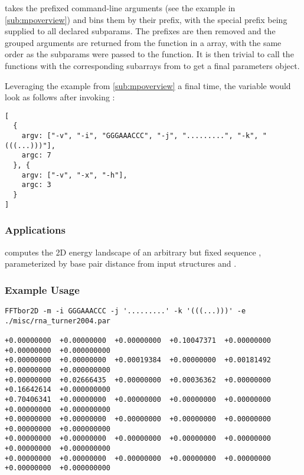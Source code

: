 \documentclass[11pt]{article}
\begin{document}
 takes the prefixed command-line arguments (see the example in \ref{sub:mpoverview}) and bins them by their prefix, with the special  prefix being supplied to all declared subparams. The prefixes are then removed and the grouped arguments are returned from the function in a  array, with the same order as the subparams were passed to the function. It is then trivial to call the  functions with the corresponding subarrays from  to get a final parameters object.

Leveraging the example from \ref{sub:mpoverview} a final time, the variable  would look as follows after invoking :
\begin{verbatim}
[
  {
    argv: ["-v", "-i", "GGGAAACCC", "-j", ".........", "-k", "(((...)))"],
    argc: 7
  }, {
    argv: ["-v", "-x", "-h"],
    argc: 3
  }
]
\end{verbatim}



\subsubsection{Applications} \label{subsub:fftborapp}

\fft computes the 2D energy landscape of an arbitrary but fixed sequence \s, parameterized by base pair distance from input structures \A and \B.

\subsubsection{Example Usage} \label{subsub:fftborex}

\begin{verbatim}
FFTbor2D -m -i GGGAAACCC -j '.........' -k '(((...)))' -e ./misc/rna_turner2004.par

+0.00000000  +0.00000000  +0.00000000  +0.10047371  +0.00000000  +0.00000000  +0.000000000
+0.00000000  +0.00000000  +0.00019384  +0.00000000  +0.00181492  +0.00000000  +0.000000000
+0.00000000  +0.02666435  +0.00000000  +0.00036362  +0.00000000  +0.16642614  +0.000000000
+0.70406341  +0.00000000  +0.00000000  +0.00000000  +0.00000000  +0.00000000  +0.000000000
+0.00000000  +0.00000000  +0.00000000  +0.00000000  +0.00000000  +0.00000000  +0.000000000
+0.00000000  +0.00000000  +0.00000000  +0.00000000  +0.00000000  +0.00000000  +0.000000000
+0.00000000  +0.00000000  +0.00000000  +0.00000000  +0.00000000  +0.00000000  +0.000000000
\end{verbatim}
\end{document}
